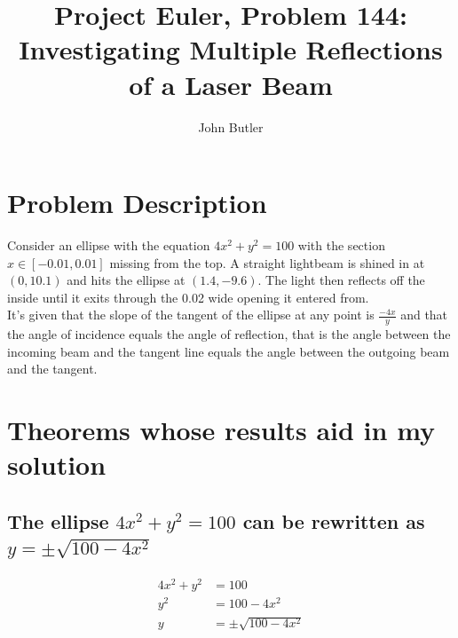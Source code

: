 \documentclass[11pt, oneside]{article}   	%
\title{Project Euler, Problem 144:\\\large{Investigating Multiple Reflections of a Laser Beam}}
\author{John Butler}
\date{}							%
\begin{document}
\maketitle

\tableofcontents
\newpage

\section{Problem Description}
	Consider an ellipse with the equation $4x^2+y^2 = 100$ with the section $x\in [-0.01, 0.01]$ missing from the
	top. A straight lightbeam is shined in at $(0,10.1)$ and hits the ellipse at $(1.4, -9.6)$. The light then
	reflects off the inside until it exits through the 0.02 wide opening it entered from.\\
	It's given that the slope of the tangent of the ellipse at any point is $\frac{-4x}{y}$ and that
	the angle of incidence equals the angle of reflection, that is the angle between the incoming beam and the
	tangent line equals the angle between the outgoing beam and the tangent.
	
\section{Theorems whose results aid in my solution}

\subsection{The ellipse $4x^2 + y^2 = 100$ can be rewritten as $y = \pm \sqrt{100 - 4x^2}$}
	\begin{align*}
		4x^2 + y^2 &= 100\\
		y^2 &= 100 - 4x^2\\
		y &= \pm \sqrt{100 - 4x^2}
	\end{align*}
\end{document}
